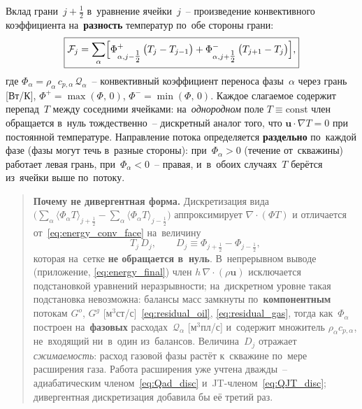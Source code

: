 \documentclass[12pt,a4paper]{article}
\newcommand{\half}{\tfrac{1}{2}}
\begin{document}
Вклад грани~$j+\half$ в~уравнение ячейки~$j$~-- произведение
конвективного коэффициента на~\textbf{разность} температур
по~обе стороны грани:
\begin{equation}\label{eq:energy_conv_face}
  \boxed{
    \mathcal{F}_j
    = \sum_\alpha\Bigl[
        \Phi_{\alpha,j-\half}^{+}\,\bigl(T_j - T_{j-1}\bigr)
      + \Phi_{\alpha,j+\half}^{-}\,\bigl(T_{j+1} - T_j\bigr)
      \Bigr],
  }
\end{equation}
где $\Phi_\alpha = \rho_\alpha\,c_{p,\alpha}\,
\mathcal{Q}_\alpha$~-- конвективный коэффициент переноса
фазы~$\alpha$ через грань [Вт/К],
$\Phi^{+} = \max(\Phi,\,0)$, $\Phi^{-} = \min(\Phi,\,0)$.
Каждое слагаемое содержит перепад~$T$ между соседними ячейками:
на~\emph{однородном} поле $T \equiv \mathrm{const}$ член обращается
в~нуль тождественно~-- дискретный аналог того, что
$\mathbf{u}\cdot\nabla T = 0$ при постоянной температуре.
Направление потока определяется \textbf{раздельно}
по~каждой фазе (фазы могут течь в~разные стороны): при~$\Phi_\alpha > 0$
(течение от~скважины) работает левая грань, при~$\Phi_\alpha < 0$~--
правая, и~в~обоих случаях~$T$ берётся из~ячейки выше по~потоку.

\begin{quote}\small
\textbf{Почему не дивергентная форма.}
Дискретизация вида
$\bigl(\sum_\alpha\langle\Phi_\alpha T\rangle_{j+\half}
- \sum_\alpha\langle\Phi_\alpha T\rangle_{j-\half}\bigr)$
аппроксимирует $\nabla\!\cdot\!(\Phi T)$ и отличается
от~\eqref{eq:energy_conv_face} на~величину
\[
  T_j\,D_j, \qquad
  D_j \equiv \Phi_{j+\half} - \Phi_{j-\half},
\]
которая на~сетке \textbf{не обращается в~нуль}.
В~непрерывном выводе (приложение, \eqref{eq:energy_final}) член
$h\,\nabla\!\cdot\!(\rho\mathbf{u})$ исключается подстановкой уравнений
неразрывности; на~дискретном уровне такая подстановка невозможна:
балансы масс замкнуты по~\textbf{компонентным} потокам $G^o$, $G^g$
[м$^3$ст/с]~\eqref{eq:residual_oil}, \eqref{eq:residual_gas},
тогда как~$\Phi_\alpha$ построен на~\textbf{фазовых}
расходах~$\mathcal{Q}_\alpha$ [м$^3$пл/с] и~содержит множитель
$\rho_\alpha c_{p,\alpha}$, не~входящий ни~в~один из~балансов.
Величина~$D_j$ отражает \emph{сжимаемость}: расход газовой фазы растёт
к~скважине по~мере расширения газа. Работа расширения уже учтена
дважды~-- адиабатическим членом~\eqref{eq:Qad_disc}
и~JT-членом~\eqref{eq:QJT_disc}; дивергентная дискретизация добавила бы
её третий раз.
\end{quote}
\end{document}
